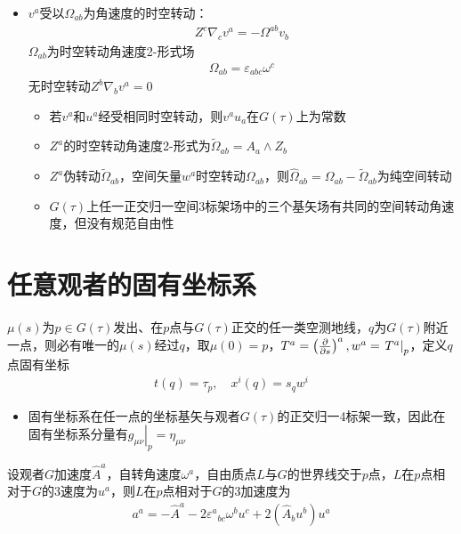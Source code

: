 \begin{itemize}
\begin{itemize}
        \item $G(\tau)$上的空间矢量场$w^a$无空间转动$\iff w^a$沿线费移
    \end{itemize}
    \item $v^a$受以$\Omega_{ab}$为角速度的时空转动：
    \begin{gather*}
        Z^c \nabla_c v^a = -\Omega^{ab} v_b
    \end{gather*}
    $\Omega_{ab}$为时空转动角速度2-形式场
    \begin{gather*}
        \Omega_{ab}=\varepsilon_{abc} \omega^c
    \end{gather*}
    无时空转动$Z^b \nabla_b v^a=0$
    \begin{itemize}
        \item 若$v^a$和$u^a$经受相同时空转动，则$v^a u_a$在$G(\tau)$上为常数
        \item $Z^a$的时空转动角速度2-形式为$\tilde{\Omega}_{ab}=A_a \wedge Z_b$
        \item $Z^a$伪转动$\tilde{\Omega}_{ab}$，空间矢量$w^a$时空转动$\Omega_{ab}$，则$\hat{\Omega}_{ab}=\Omega_{ab}-\tilde{\Omega}_{ab}$为纯空间转动
        \item $G(\tau)$上任一正交归一空间3标架场中的三个基矢场有共同的空间转动角速度，但没有规范自由性
    \end{itemize}
\end{itemize}

\section{任意观者的固有坐标系}

$\mu(s)$为$p \in G(\tau)$发出、在$p$点与$G(\tau)$正交的任一类空测地线，$q$为$G(\tau)$附近一点，则必有唯一的$\mu(s)$经过$q$，取$\mu(0)=p$，$T^a=\left(\frac{\partial }{\partial s}\right)^a, w^a=\left.T^a \right|_p$，定义$q$点固有坐标
\begin{gather*}
    t(q)=\tau_p,\quad x^i(q)=s_q w^i
\end{gather*}
\begin{itemize}
    \item 固有坐标系在任一点的坐标基矢与观者$G(\tau)$的正交归一4标架一致，因此在固有坐标系分量有$\left.g_{\mu \nu} \right|_p = \eta_{\mu \nu}$
\end{itemize}

设观者$G$加速度$\hat{A}^a$，自转角速度$\omega^a$，自由质点$L$与$G$的世界线交于$p$点，$L$在$p$点相对于$G$的3速度为$u^a$，则$L$在$p$点相对于$G$的3加速度为
\begin{gather*}
    a^a=-\hat{A}^a-2{\varepsilon^a}_{bc} \omega^b u^c+2(\hat{A}_b u^b) u^a
\end{gather*}

